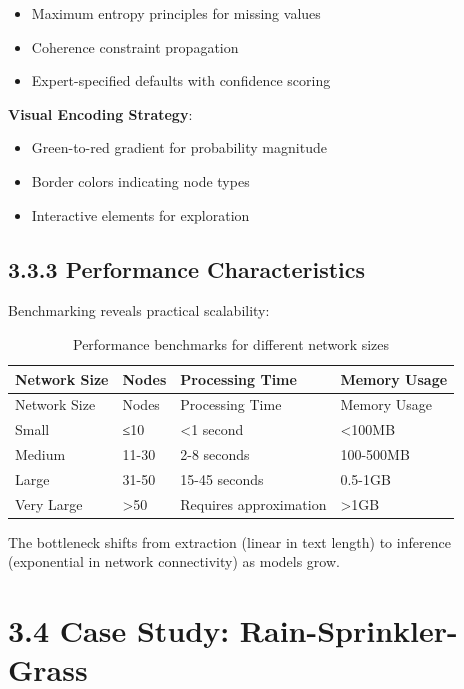 \documentclass[
  11pt,
  letterpaper,
]{book}
\providecommand{\tightlist}{%
  \setlength{\itemsep}{0pt}\setlength{\parskip}{0pt}}
\begin{document}
\begin{itemize}
\tightlist
\item
  Maximum entropy principles for missing values
\item
  Coherence constraint propagation
\item
  Expert-specified defaults with confidence scoring
\end{itemize}

\textbf{Visual Encoding Strategy}:

\begin{itemize}
\tightlist
\item
  Green-to-red gradient for probability magnitude
\item
  Border colors indicating node types
\item
  Interactive elements for exploration
\end{itemize}

\subsection*{3.3.3 Performance Characteristics}\label{sec-performance}

Benchmarking reveals practical scalability:

\begin{longtable}[]{@{}llll@{}}
\caption{Performance benchmarks for different network
sizes}\label{tbl-performance}\tabularnewline
\toprule\noalign{}
Network Size & Nodes & Processing Time & Memory Usage \\
\midrule\noalign{}
\endfirsthead
\toprule\noalign{}
Network Size & Nodes & Processing Time & Memory Usage \\
\midrule\noalign{}
\endhead
\bottomrule\noalign{}
\endlastfoot
Small & ≤10 & \textless1 second & \textless100MB \\
Medium & 11-30 & 2-8 seconds & 100-500MB \\
Large & 31-50 & 15-45 seconds & 0.5-1GB \\
Very Large & \textgreater50 & Requires approximation &
\textgreater1GB \\
\end{longtable}

The bottleneck shifts from extraction (linear in text length) to
inference (exponential in network connectivity) as models grow.

\section*{3.4 Case Study:
Rain-Sprinkler-Grass}\label{sec-case-rain-sprinkler}
\end{document}
